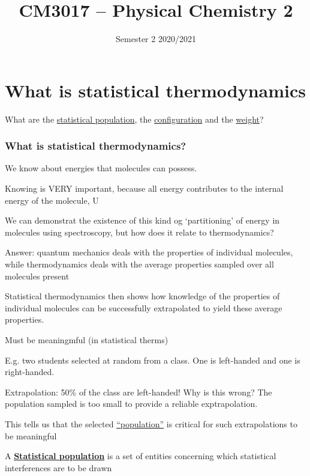 \documentclass[a4paper,12pt,titlepage]{article}
\title{CM3017 -- Physical Chemistry 2}
\institute{School of Chemistry \\ University College Cork}}
\date{Semester 2 2020/2021}
\begin{document}
\begin{frame}
	\titlepage
\end{frame}

\tableofcontents

\section{What is statistical thermodynamics}

\begin{frame}
What are the \underline{statistical population}, the \underline{configuration} and the \underline{weight}?
\end{frame}

\begin{frame}[allowframebreaks]
\frametitle{What is statistical thermodynamics?}
We know about energies that molecules can possess. \newline

Knowing is VERY important, because all energy contributes to the internal energy of the molecule, U\newline

We can demonstrat the existence of this kind og `partitioning' of energy in molecules using spectroscopy, but how does it relate to thermodynamics? \newline

Answer: quantum mechanics deals with the properties of individual molecules, while thermodynamics deals with the average properties sampled over all molecules present

Statistical thermodynamics then shows how knowledge of the properties of individual molecules can be successfully extrapolated to yield these average properties.  \newline

Must be meaningmful (in statistical therms) \newline

E.g. two students selected at random from a class. One is left-handed and one is right-handed. \newline

Extrapolation: 50\% of the class are left-handed! Why is this wrong? The population sampled is too small to provide a reliable exptrapolation. \newline

This tells us that the selected \underline{``population''} is critical for such extrapolations to be meaningful \newline

A \underline{\textbf{Statistical population}} is a set of entities concerning which statistical interferences are to be drawn
\end{frame}
\end{document}
